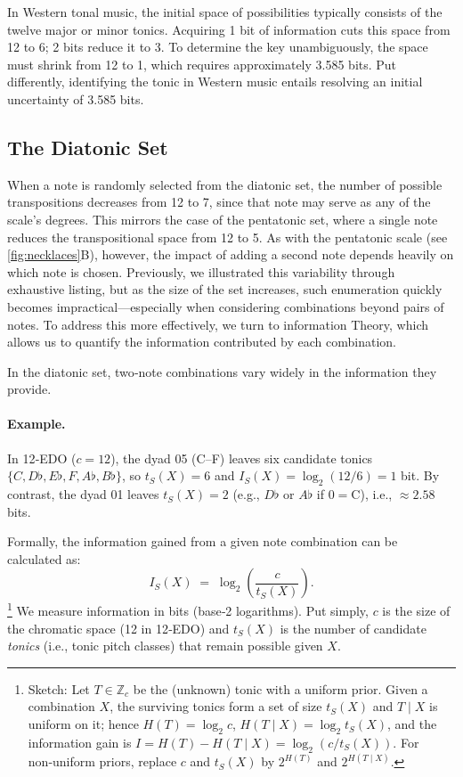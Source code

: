 \documentclass[10pt,twocolumn]{article}
\numberwithin{equation}{section} %
\begin{document}
    In Western tonal music, the initial space of possibilities typically consists of the twelve major or minor tonics.
    Acquiring 1 bit of information cuts this space from 12 to 6; 2 bits reduce it to 3.
    To determine the key unambiguously, the space must shrink from 12 to 1, which requires approximately 3.585 bits.
    Put differently, identifying the tonic in Western music entails resolving an initial uncertainty of 3.585 bits.

    \subsection{The Diatonic Set}

    When a note is randomly selected from the diatonic set, the number of possible transpositions decreases from 12 to 7, since that note may serve as any of the scale's degrees.
    This mirrors the case of the pentatonic set, where a single note reduces the transpositional space from 12 to 5.
    As with the pentatonic scale (see \autoref{fig:necklaces}B), however, the impact of adding a second note depends heavily on which note is chosen.
    Previously, we illustrated this variability through exhaustive listing, but as the size of the set increases, such enumeration quickly becomes impractical—especially when considering combinations beyond pairs of notes.
    To address this more effectively, we turn to information Theory, which allows us to quantify the information contributed by each combination.

    In the diatonic set, two‑note combinations vary widely in the information they provide.
    \paragraph{Example.}
    In 12‑EDO ($c=12$), the dyad 05 (C–F) leaves six candidate tonics
    $\{C,D\flat,E\flat,F,A\flat,B\flat\}$, so $t_S(X)=6$ and $I_S(X)=\log_2(12/6)=1$ bit.
    By contrast, the dyad 01 leaves $t_S(X)=2$ (e.g., $D\flat$ or $A\flat$ if $0{=}$C), i.e., $\approx 2.58$ bits.

    Formally, the information gained from a given note combination can be calculated as:
    \begin{equation}
        I_S(X) \;=\; \log_{2}\!\left(\frac{c}{t_S(X)}\right).
        \label{eq:derivingSelfInformation}
    \end{equation}
    \footnote{Sketch: Let $T\in\mathbb{Z}_c$ be the (unknown) tonic with a uniform prior. Given a combination $X$, the surviving tonics form a set of size $t_S(X)$ and $T\mid X$ is uniform on it; hence $H(T)=\log_2 c$, $H(T\mid X)=\log_2 t_S(X)$, and the information gain is $I=H(T)-H(T\mid X)=\log_2(c/t_S(X))$. For non‑uniform priors, replace $c$ and $t_S(X)$ by $2^{H(T)}$ and $2^{H(T\mid X)}$.}
    We measure information in bits (base‑2 logarithms). Put simply, $c$ is the size of the chromatic space (12 in 12‑EDO) and $t_S(X)$ is the number of candidate \emph{tonics} (i.e., tonic pitch classes) that remain possible given $X$.
\end{document}
